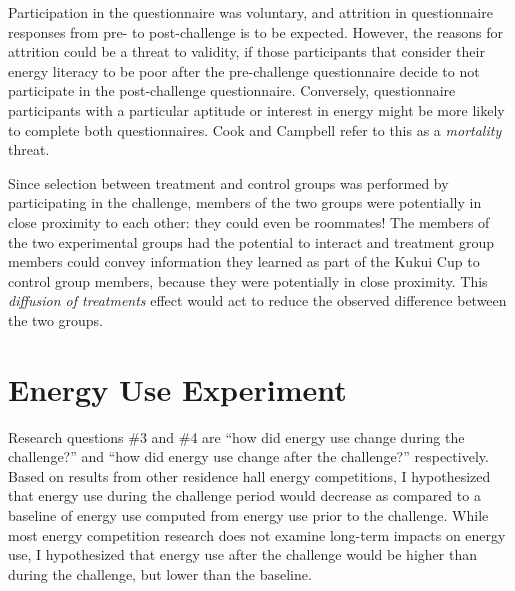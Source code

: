 Participation in the questionnaire was voluntary, and attrition in questionnaire responses from pre- to post-challenge is to be expected. However, the reasons for attrition could be a threat to validity, if those participants that consider their energy literacy to be poor after the pre-challenge questionnaire decide to not participate in the post-challenge questionnaire. Conversely, questionnaire participants with a particular aptitude or interest in energy might be more likely to complete both questionnaires. Cook and Campbell refer to this as a \emph{mortality} threat.

Since selection between treatment and control groups was performed by participating in the challenge, members of the two groups were potentially in close proximity to each other: they could even be roommates! The members of the two experimental groups had the potential to interact and treatment group members could convey information they learned as part of the Kukui Cup to control group members, because they were potentially in close proximity. This \emph{diffusion of treatments} effect would act to reduce the observed difference between the two groups.


\section{Energy Use Experiment}
\label{sec:energy-use-exp}

Research questions \#3 and \#4 are ``how did energy use change during the challenge?'' and ``how did energy use change after the challenge?'' respectively. Based on results from other residence hall energy competitions, I hypothesized that energy use during the challenge period would decrease as compared to a baseline of energy use computed from energy use prior to the challenge. While most energy competition research does not examine long-term impacts on energy use, I hypothesized that energy use after the challenge would be higher than during the challenge, but lower than the baseline.

%

